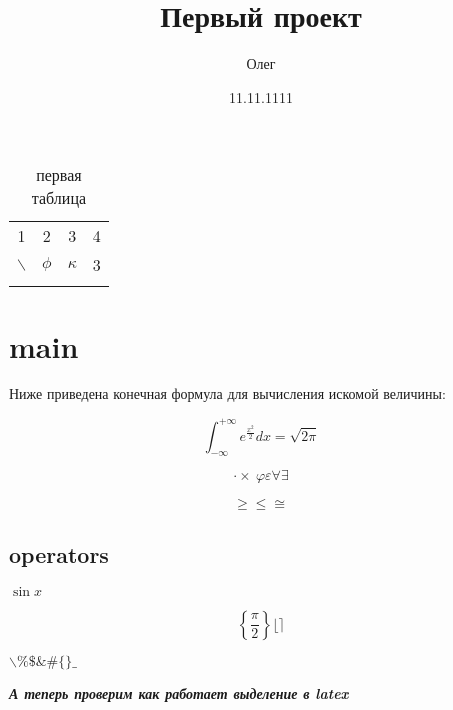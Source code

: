 \documentclass[a4paper, 12pt]{article}
\begin{document}
 

\pagestyle{main}


\begin{titlepage}
    \title{Первый проект}
    \author{Олег}
    \date{11.11.1111}
    \maketitle
\end{titlepage}
 




\tableofcontents
\newpage


\begin{table}[h]
    \begin{tabular}{||c|c|c|c||}
        \hline
        1&2&3&4\\
        \cline{1-2}
        \cline{1-4} 
        $\backslash$&$\phi$&$\kappa$&3\\
        \hline
        \label{first} 
    \end{tabular}
\caption{первая таблица}
\end{table}

\thetable







\section*{\centering main}

Ниже приведена конечная формула для вычисления искомой величины:

\[\int_{-\infty}^{+\infty} e^{\frac{x^2}{2}}dx=\sqrt{2\pi}\]

\[\cdot \times\ \varphi \varepsilon \forall \exists\]

\[\ge \le   \cong\]

\subsection{operators}$\sin{x}$

\[\left\{\frac{\pi}{2}\right\}  \lfloor \rceil\]

$\backslash \%       \$ \& \#       \{ \} \_$

\textit{\textbf{{А теперь проверим как работает выделение в latex}}}
\end{document}
